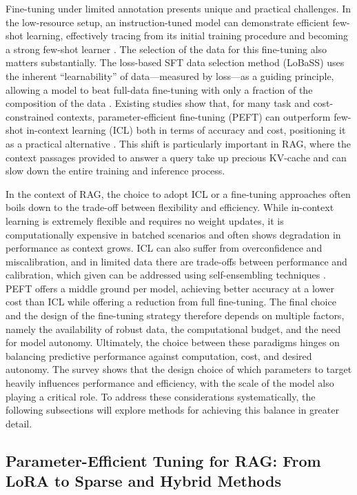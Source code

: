\documentclass[11pt]{article}
\begin{document}
Fine-tuning under limited annotation presents unique and practical challenges. In the low-resource setup, an instruction-tuned model can demonstrate efficient few-shot learning, effectively tracing from its initial training procedure and becoming a strong few-shot learner \cite{ref141}. The selection of the data for this fine-tuning also matters substantially. The loss-based SFT data selection method (LoBaSS) uses the inherent ``learnability'' of data---measured by loss---as a guiding principle, allowing a model to beat full-data fine-tuning with only a fraction of the composition of the data \cite{ref203}. Existing studies show that, for many task and cost-constrained contexts, parameter-efficient fine-tuning (PEFT) can outperform few-shot in-context learning (ICL) both in terms of accuracy and cost, positioning it as a practical alternative \cite{ref204}. This shift is particularly important in RAG, where the context passages provided to answer a query take up precious KV-cache and can slow down the entire training and inference process.

In the context of RAG, the choice to adopt ICL or a fine-tuning approaches often boils down to the trade-off between flexibility and efficiency. While in-context learning is extremely flexible and requires no weight updates, it is computationally expensive in batched scenarios and often shows degradation in performance as context grows. ICL can also suffer from overconfidence and miscalibration, and in limited data there are trade-offs between performance and calibration, which given can be addressed using self-ensembling techniques \cite{ref205}. PEFT offers a middle ground per model, achieving better accuracy at a lower cost than ICL while offering a reduction from full fine-tuning. The final choice and the design of the fine-tuning strategy therefore depends on multiple factors, namely the availability of robust data, the computational budget, and the need for model autonomy. Ultimately, the choice between these paradigms hinges on balancing predictive performance against computation, cost, and desired autonomy. The survey shows that the design choice of which parameters to target heavily influences performance and efficiency, with the scale of the model also playing a critical role. To address these considerations systematically, the following subsections will explore methods for achieving this balance in greater detail.

\subsection{Parameter-Efficient Tuning for RAG: From LoRA to Sparse and Hybrid Methods}
\end{document}
